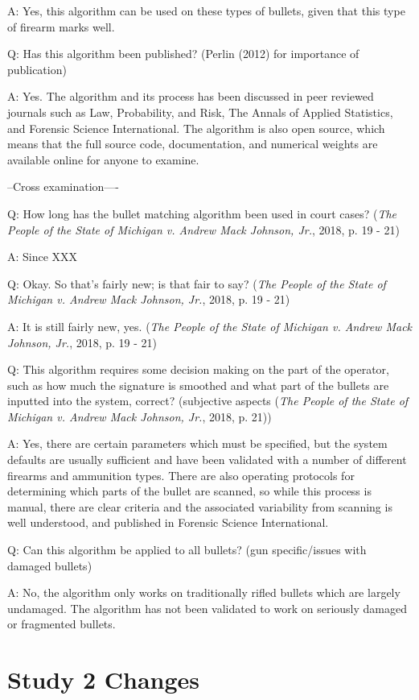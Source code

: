 \documentclass[print]{nuthesis}
\begin{document}
A: Yes, this algorithm can be used on these types of bullets, given that this type of firearm marks well.

Q: Has this algorithm been published? (Perlin (2012) for importance of publication)

A: Yes. The algorithm and its process has been discussed in peer reviewed journals such as Law, Probability, and Risk, The Annals of Applied Statistics, and Forensic Science International.
The algorithm is also open source, which means that the full source code, documentation, and numerical weights are available online for anyone to examine.

--Cross examination----

Q: How long has the bullet matching algorithm been used in court cases? (\emph{The {People} of the {State} of {Michigan} v. Andrew {Mack} {Johnson}, {Jr.}}, 2018, p. 19 - 21)

A: Since XXX

Q: Okay. So that's fairly new; is that fair to say? (\emph{The {People} of the {State} of {Michigan} v. Andrew {Mack} {Johnson}, {Jr.}}, 2018, p. 19 - 21)

A: It is still fairly new, yes. (\emph{The {People} of the {State} of {Michigan} v. Andrew {Mack} {Johnson}, {Jr.}}, 2018, p. 19 - 21)

Q: This algorithm requires some decision making on the part of the operator, such as how much the signature is smoothed and what part of the bullets are inputted into the system, correct? (subjective aspects (\emph{The {People} of the {State} of {Michigan} v. Andrew {Mack} {Johnson}, {Jr.}}, 2018, p. 21))

A: Yes, there are certain parameters which must be specified, but the system defaults are usually sufficient and have been validated with a number of different firearms and ammunition types.
There are also operating protocols for determining which parts of the bullet are scanned, so while this process is manual, there are clear criteria and the associated variability from scanning is well understood, and published in Forensic Science International.

Q: Can this algorithm be applied to all bullets? (gun specific/issues with damaged bullets)

A: No, the algorithm only works on traditionally rifled bullets which are largely undamaged.
The algorithm has not been validated to work on seriously damaged or fragmented bullets.

\hypertarget{study-2-changes}{%
\chapter{Study 2 Changes}\label{study-2-changes}}
\end{document}
